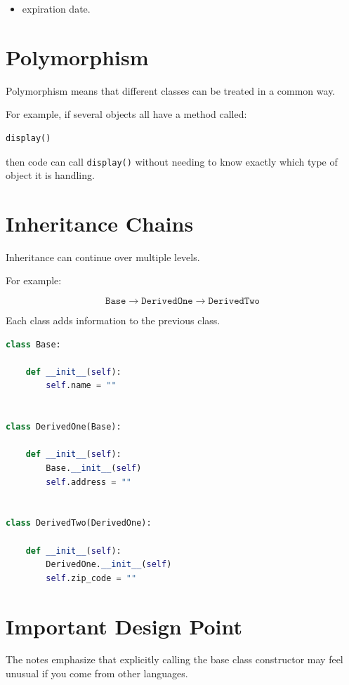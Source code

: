 \documentclass[11pt]{article}
\begin{document}
\begin{itemize}
    \item expiration date.
\end{itemize}

\section{Polymorphism}

Polymorphism means that different classes can be treated in a common way.

For example, if several objects all have a method called:

\begin{lstlisting}[language=Python]
display()
\end{lstlisting}

then code can call \texttt{display()} without needing to know exactly which type of object it is handling.

\section{Inheritance Chains}

Inheritance can continue over multiple levels.

For example:

\[
\texttt{Base}
\rightarrow
\texttt{DerivedOne}
\rightarrow
\texttt{DerivedTwo}
\]

Each class adds information to the previous class.

\begin{lstlisting}[language=Python]
class Base:

    def __init__(self):
        self.name = ""


class DerivedOne(Base):

    def __init__(self):
        Base.__init__(self)
        self.address = ""


class DerivedTwo(DerivedOne):

    def __init__(self):
        DerivedOne.__init__(self)
        self.zip_code = ""
\end{lstlisting}

\section{Important Design Point}

The notes emphasize that explicitly calling the base class constructor may feel unusual if you come from other languages.
\end{document}
